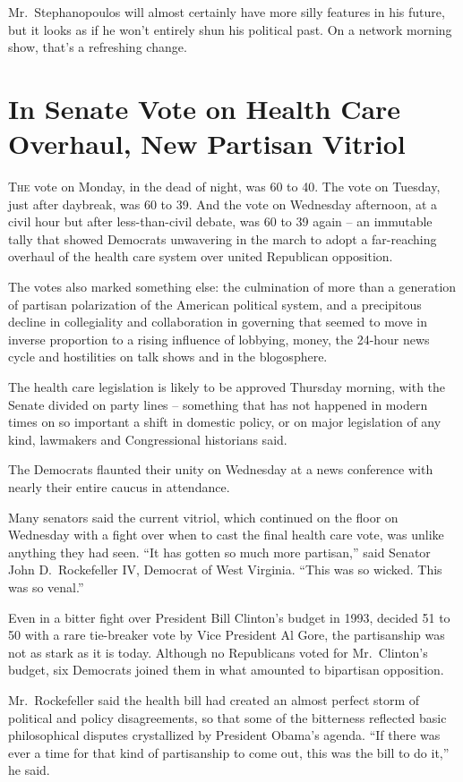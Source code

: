 ﻿\documentclass[12pt]{article}
\begin{document}
Mr.~Stephanopoulos will almost certainly have more silly features in his future, but it looks as if
he won't entirely shun his political past. On a network morning show, that's a refreshing change.

\section{In Senate Vote on Health Care Overhaul, New Partisan Vitriol}

\lettrine{T}{he} vote on Monday, in the dead of night, was 60 to 40. The
vote on Tuesday, just after daybreak, was 60 to 39. And the vote on Wednesday afternoon, at a civil
hour but after less-than-civil debate, was 60 to 39 again -- an immutable tally that showed
Democrats unwavering in the march to adopt a far-reaching overhaul of the health care system over
united Republican opposition.

The votes also marked something else: the culmination of more than a generation of partisan
polarization of the American political system, and a precipitous decline in collegiality and
collaboration in governing that seemed to move in inverse proportion to a rising influence of
lobbying, money, the 24-hour news cycle and hostilities on talk shows and in the blogosphere.

The health care legislation is likely to be approved Thursday morning, with the Senate divided on
party lines -- something that has not happened in modern times on so important a shift in domestic
policy, or on major legislation of any kind, lawmakers and Congressional historians said.

The Democrats flaunted their unity on Wednesday at a news conference with nearly their entire caucus
in attendance.

Many senators said the current vitriol, which continued on the floor on Wednesday with a fight over
when to cast the final health care vote, was unlike anything they had seen. ``It has gotten so much
more partisan,'' said Senator John D.~Rockefeller IV, Democrat of West Virginia. ``This was so
wicked. This was so venal.''

Even in a bitter fight over President Bill Clinton's budget in 1993, decided 51 to 50 with a rare
tie-breaker vote by Vice President Al Gore, the partisanship was not as stark as it is today.
Although no Republicans voted for Mr.~Clinton's budget, six Democrats joined them in what amounted
to bipartisan opposition.

Mr.~Rockefeller said the health bill had created an almost perfect storm of political and policy
disagreements, so that some of the bitterness reflected basic philosophical disputes crystallized by
President Obama's agenda. ``If there was ever a time for that kind of partisanship to come out, this
was the bill to do it,'' he said.
\end{document}
